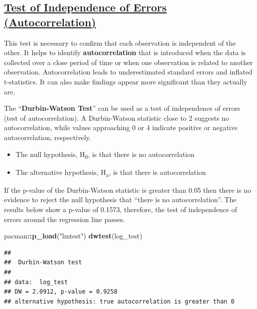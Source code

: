 \documentclass[
]{article}
\newenvironment{Shaded}{\begin{snugshade}}{\end{snugshade}}
\newcommand{\FunctionTok}[1]{\textcolor[rgb]{0.13,0.29,0.53}{\textbf{#1}}}
\newcommand{\NormalTok}[1]{#1}
\newcommand{\SpecialCharTok}[1]{\textcolor[rgb]{0.81,0.36,0.00}{\textbf{#1}}}
\newcommand{\StringTok}[1]{\textcolor[rgb]{0.31,0.60,0.02}{#1}}
\begin{document}
\subsection{\texorpdfstring{\ul{\textbf{Test of Independence of Errors
(Autocorrelation)}}}{Test of Independence of Errors (Autocorrelation)}}\label{test-of-independence-of-errors-autocorrelation}

This test is necessary to confirm that each observation is independent
of the other. It helps to identify \textbf{autocorrelation} that is
introduced when the data is collected over a close period of time or
when one observation is related to another observation. Autocorrelation
leads to underestimated standard errors and inflated t-statistics. It
can also make findings appear more significant than they actually are.

The ``\textbf{Durbin-Watson Test}'' can be used as a test of
independence of errors (test of autocorrelation). A Durbin-Watson
statistic close to 2 suggests no autocorrelation, while values
approaching 0 or 4 indicate positive or negative autocorrelation,
respectively.

\begin{itemize}
\item
  The null hypothesis, H\textsubscript{0}, is that there is no
  autocorrelation
\item
  The alternative hypothesis, H\textsubscript{a}, is that there is
  autocorrelation
\end{itemize}

If the p-value of the Durbin-Watson statistic is greater than 0.05 then
there is no evidence to reject the null hypothesis that ``there is no
autocorrelation''. The results below show a p-value of 0.1573,
therefore, the test of independence of errors around the regression line
passes.

\begin{Shaded}
\begin{Highlighting}[]
\NormalTok{pacman}\SpecialCharTok{::}\FunctionTok{p\_load}\NormalTok{(}\StringTok{"lmtest"}\NormalTok{)}
\FunctionTok{dwtest}\NormalTok{(log\_test)}
\end{Highlighting}
\end{Shaded}

\begin{verbatim}
## 
##  Durbin-Watson test
## 
## data:  log_test
## DW = 2.0912, p-value = 0.9258
## alternative hypothesis: true autocorrelation is greater than 0
\end{verbatim}
\end{document}
